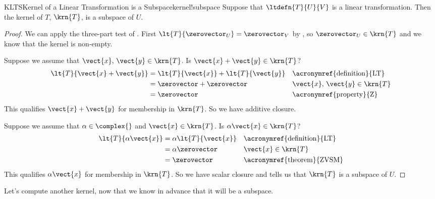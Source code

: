 %
\begin{theorem}{KLTS}{Kernel of a Linear Transformation is a Subspace}{kernel!subspace}
Suppose that $\ltdefn{T}{U}{V}$ is a linear transformation.  Then the kernel of $T$, $\krn{T}$, is a subspace of $U$.
\end{theorem}
%
\begin{proof}
We can apply the three-part test of .  First $\lt{T}{\zerovector_U}=\zerovector_V$ by , so $\zerovector_U\in\krn{T}$ and we know that the kernel is non-empty.\par
%
Suppose we assume that $\vect{x},\,\vect{y}\in\krn{T}$.  Is $\vect{x}+\vect{y}\in\krn{T}$?
%
\begin{align*}
\lt{T}{\vect{x}+\vect{y}}&=\lt{T}{\vect{x}}+\lt{T}{\vect{y}}&&\text{\acronymref{definition}{LT}}\\
&=\zerovector+\zerovector&&\vect{x},\,\vect{y}\in\krn{T}\\
&=\zerovector&&\text{\acronymref{property}{Z}}
\end{align*}
%
This qualifies $\vect{x}+\vect{y}$ for membership in $\krn{T}$.  So we have additive closure.\par
%
Suppose we assume that $\alpha\in\complex{\null}$ and $\vect{x}\in\krn{T}$.  Is $\alpha\vect{x}\in\krn{T}$?
%
\begin{align*}
\lt{T}{\alpha\vect{x}}&=\alpha\lt{T}{\vect{x}}&&\text{\acronymref{definition}{LT}}\\
&=\alpha\zerovector&&\vect{x}\in\krn{T}\\
&=\zerovector&&\text{\acronymref{theorem}{ZVSM}}
\end{align*}
%
This qualifies $\alpha\vect{x}$ for membership in $\krn{T}$.  So we have scalar closure and  tells us that $\krn{T}$ is a subspace of $U$.\par
%
\end{proof}
%
Let's compute another kernel, now that we know in advance that it will be a subspace.
%
%
